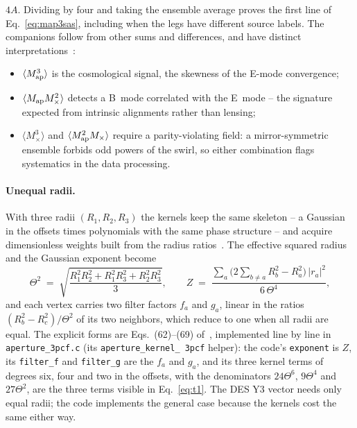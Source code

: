 \documentclass[11pt]{article}
\newcommand{\Map}{M_{\rm ap}}
\newcommand{\Mx}{M_{\times}}
\newcommand{\us}{\_\allowbreak}
\numberwithin{equation}{section}
\begin{document}
$4A$. Dividing by four and taking the ensemble average proves the first
line of Eq.~\eqref{eq:map3sas}, including when the legs have different
source labels. The companions follow from other sums and differences,
and have distinct interpretations~\cite{SKL}:
\begin{itemize}
  \item $\langle \Map^3\rangle$ is the cosmological signal, the
    skewness of the E-mode convergence;
  \item $\langle \Map \Mx^2\rangle$ detects a B~mode correlated
    with the E~mode -- the signature expected from intrinsic
    alignments rather than lensing;
  \item $\langle \Mx^3\rangle$ and $\langle \Map^2 \Mx\rangle$
    require a parity-violating field: a mirror-symmetric ensemble
    forbids odd powers of the swirl, so either combination flags
    systematics in the data processing.
\end{itemize}

\paragraph{Unequal radii.}
With three radii $(R_1, R_2, R_3)$ the kernels keep the same
skeleton -- a Gaussian in the offsets times polynomials with the
same phase structure -- and acquire dimensionless weights built from
the radius ratios~\cite{SKL}.  The effective squared radius and the
Gaussian exponent become
\begin{equation}
  \Theta^2 \;=\;
  \sqrt{\frac{R_1^2 R_2^2 + R_1^2 R_3^2 + R_2^2 R_3^2}{3}},
  \qquad
  Z \;=\;
  \frac{\sum_{a} \bigl(2\sum_{b \neq a} R_b^2
  - R_a^2\bigr)\, |r_a|^2}{6\,\Theta^4} ,
  \label{eq:sklz}
\end{equation}
and each vertex carries two filter factors $f_a$ and $g_a$, linear
in the ratios $(R_b^2 - R_c^2)/\Theta^2$ of its two neighbors,
which reduce to one when all radii are equal.  The explicit forms
are Eqs.~(62)--(69) of~\cite{SKL}, implemented line by line in
\texttt{aperture\us 3pcf.c} (its \texttt{aperture\us kernel\us
3pcf} helper): the code's \texttt{exponent} is $Z$, its
\texttt{filter\us f} and \texttt{filter\us g} are the $f_a$ and
$g_a$, and its three kernel terms of degrees six, four and two in
the offsets, with the denominators $24\Theta^6$, $9\Theta^4$ and
$27\Theta^2$, are the three terms visible in
Eq.~\eqref{eq:t1}.  The DES Y3 vector needs only equal radii; the
code implements the general case because the kernels cost the same
either way.
\end{document}
